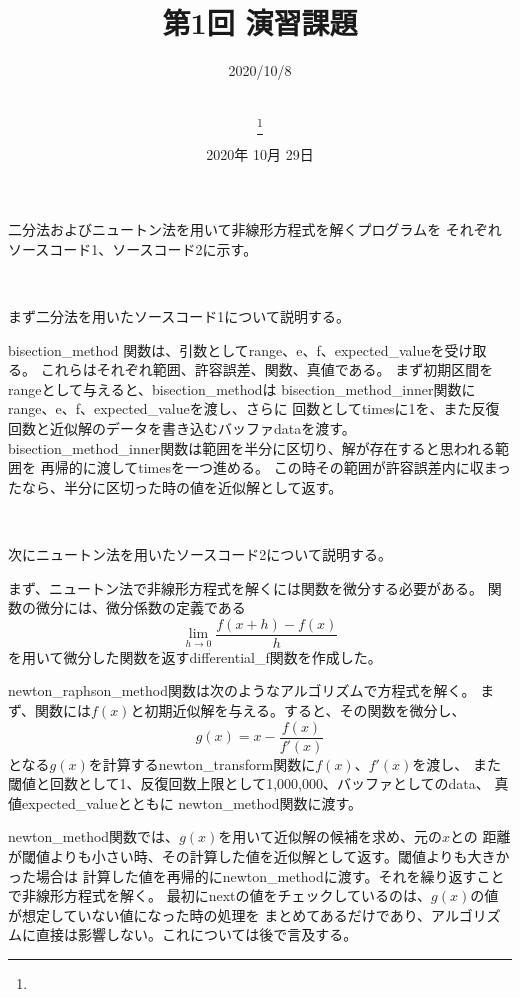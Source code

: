 \documentclass[uplatex, 11pt,a4j, titlepage]{jsarticle}
\title{第1回 演習課題}
\date{2020年 10月 29日}
\author{
    \small{\myid} \\
    \myname\thanks{\mymail}
}
\begin{document}
\maketitle


\subtitle{2020/10/8}


二分法およびニュートン法を用いて非線形方程式を解くプログラムを
それぞれソースコード1、ソースコード2に示す。

\ 

まず二分法を用いたソースコード1について説明する。

bisection\_method 関数は、引数としてrange、e、f、expected\_valueを受け取る。
これらはそれぞれ範囲、許容誤差、関数、真値である。
まず初期区間をrangeとして与えると、bisection\_methodは
bisection\_method\_inner関数にrange、e、f、expected\_valueを渡し、さらに
回数としてtimesに1を、また反復回数と近似解のデータを書き込むバッファdataを渡す。
bisection\_method\_inner関数は範囲を半分に区切り、解が存在すると思われる範囲を
再帰的に渡してtimesを一つ進める。
この時その範囲が許容誤差内に収まったなら、半分に区切った時の値を近似解として返す。

\ 

次にニュートン法を用いたソースコード2について説明する。

まず、ニュートン法で非線形方程式を解くには関数を微分する必要がある。
関数の微分には、微分係数の定義である
\begin{equation}
    \lim_{h \to 0} \frac{f(x + h) - f(x)}{h}   
\end{equation}
を用いて微分した関数を返すdifferential\_f関数を作成した。

newton\_raphson\_method関数は次のようなアルゴリズムで方程式を解く。
まず、関数には$f(x)$と初期近似解を与える。すると、その関数を微分し、
\begin{equation}
    g(x) = x - \frac{f(x)}{f'(x)}
\end{equation}
となる$g(x)$を計算するnewton\_transform関数に$f(x)$、$f'(x)$を渡し、
また閾値と回数として1、反復回数上限として1,000,000、バッファとしてのdata、
真値expected\_valueとともに
newton\_method関数に渡す。

newton\_method関数では、$g(x)$を用いて近似解の候補を求め、元の$x$との
距離が閾値よりも小さい時、その計算した値を近似解として返す。閾値よりも大きかった場合は
計算した値を再帰的にnewton\_methodに渡す。それを繰り返すことで非線形方程式を解く。
最初にnextの値をチェックしているのは、$g(x)$の値が想定していない値になった時の処理を
まとめてあるだけであり、アルゴリズムに直接は影響しない。これについては後で言及する。
\end{document}
